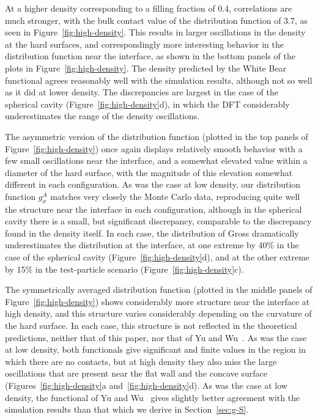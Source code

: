 At a higher density corresponding to a filling fraction of 0.4,
correlations are much stronger, with the bulk contact value of the
distribution function of 3.7, as seen in Figure~\ref{fig:high-density}.
This results in larger oscillations in the density at the hard
surfaces, and correspondingly more interesting behavior in the
distribution function near the interface, as shown in the bottom panels
of the plots in Figure~\ref{fig:high-density}.  The density predicted
by the White Bear functional agrees reasonably well with the
simulation results, although not so well as it did at lower density.
The discrepancies are largest in the case of the spherical cavity
(Figure~\ref{fig:high-density}d), in which the DFT considerably
underestimates the range of the density oscillations.

The asymmetric version of the distribution function (plotted
in the top panels of Figure~\ref{fig:high-density}) once again displays
relatively smooth behavior with a few small
oscillations near the interface, and a somewhat elevated value within
a diameter of the hard surface, with the magnitude of this elevation
somewhat different in each configuration.  As was the case at low
density, our distribution function $g_\sigma^A$ matches very closely
the Monte Carlo data, reproducing quite well the structure near the
interface in each configuration, although in the spherical cavity there is a small, but significant
discrepancy, comparable to the discrepancy found in the density
itself.  In each case, the distribution of Gross dramatically
underestimates the distribution at the interface, at one extreme by
40\% in the case of the spherical cavity
(Figure~\ref{fig:high-density}d), and at the other extreme by 15\%
in the test-particle scenario (Figure~\ref{fig:high-density}c).


The symmetrically averaged distribution function (plotted
in the middle panels of Figure~\ref{fig:high-density}) shows considerably
more structure near the interface at high density, and this structure
varies considerably depending on the curvature of the hard surface.
In each case, this structure is not reflected in the theoretical
predictions, neither that of this paper, nor that of Yu and
Wu~\cite{yu2002fmt-dft-inhomogeneous-associating}.  As was the case at
low density, both functionals give significant and finite values in
the region in which there are no contacts, but at high density they
also miss the large oscillations that are present near the flat wall
and the concave surface (Figures~\ref{fig:high-density}a
and~\ref{fig:high-density}d).  As was the case at low density, the
functional of Yu and Wu~\cite{yu2002fmt-dft-inhomogeneous-associating}
gives slightly better agreement with the simulation results than that
which we derive in Section~\ref{sec:g-S}.

